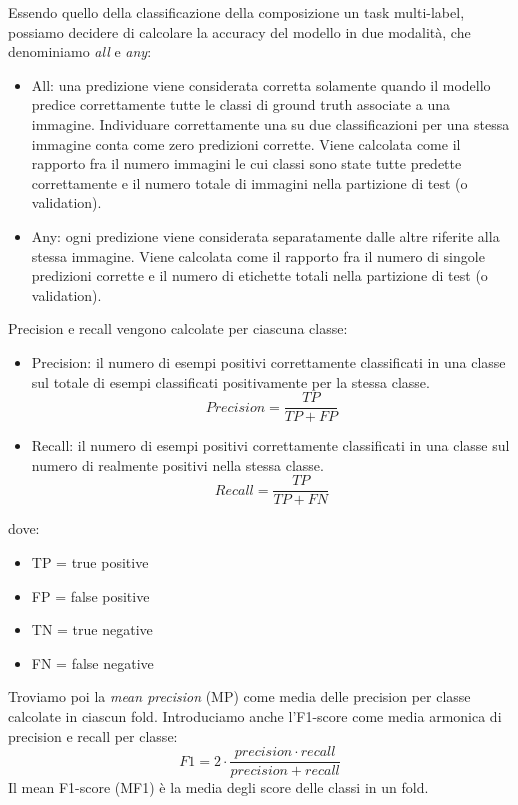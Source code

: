 Essendo quello della classificazione della composizione un task multi-label, possiamo decidere di calcolare la accuracy del modello in due modalità, che denominiamo \textit{all} e \textit{any}:
\begin{itemize}
    \item All: una predizione viene considerata corretta solamente quando il modello predice correttamente tutte le classi di ground truth associate a una immagine. Individuare correttamente una su due classificazioni per una stessa immagine conta come zero predizioni corrette. Viene calcolata come il rapporto fra il numero immagini le cui classi sono state tutte predette correttamente e il numero totale di immagini nella partizione di test (o validation).
    \item Any: ogni predizione viene considerata separatamente dalle altre riferite alla stessa immagine. Viene calcolata come il rapporto fra il numero di singole predizioni corrette e il numero di etichette totali nella partizione di test (o validation).
\end{itemize}
Precision e recall vengono calcolate per ciascuna classe:
\begin{itemize}
    \item Precision: il numero di esempi positivi correttamente classificati in una classe sul totale di esempi classificati positivamente per la stessa classe.
    \begin{equation}
        Precision = \frac{TP}{TP + FP}
    \end{equation}
    \item Recall: il numero di esempi positivi correttamente classificati in una classe sul numero di realmente positivi nella stessa classe.
    \begin{equation}
        Recall = \frac{TP}{TP + FN}
    \end{equation}
\end{itemize}
dove:
\begin{itemize}
    \item TP = true positive
    \item FP = false positive
    \item TN = true negative
    \item FN = false negative
\end{itemize}
Troviamo poi la \textit{mean precision} (MP) come media delle precision per classe calcolate in ciascun fold. Introduciamo anche l'F1-score come media armonica di precision e recall per classe:
\begin{equation}
    F1 = 2 \cdot \frac{precision \cdot recall}{precision + recall}
\end{equation}
Il mean F1-score (MF1) è la media degli score delle classi in un fold. 

